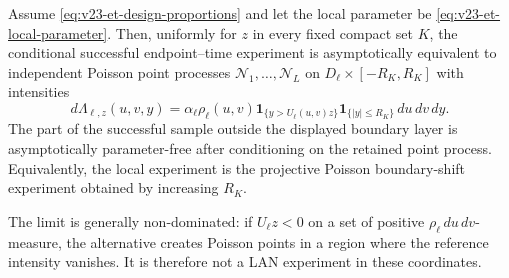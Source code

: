 \begin{theorem}
\label{thm:v23-et-poisson}
Assume \eqref{eq:v23-et-design-proportions} and let the local parameter be
\eqref{eq:v23-et-local-parameter}.  Then, uniformly for \(z\) in every fixed
compact set \(K\), the conditional successful endpoint--time experiment is
asymptotically equivalent to independent Poisson point processes
\(\mathcal N_1,\ldots,\mathcal N_L\) on
\(D_\ell\times[-R_K,R_K]\) with intensities
\begin{equation}\label{eq:v23-et-poisson-intensity}
 d\Lambda_{\ell,z}(u,v,y)
 =\alpha_\ell\rho_\ell(u,v)
   \mathbf 1_{\{y>U_\ell(u,v)z\}}
   \mathbf 1_{\{|y|\le R_K\}}\,du\,dv\,dy.
\end{equation}
The part of the successful sample outside the displayed boundary layer is
asymptotically parameter-free after conditioning on the retained point
process.  Equivalently, the local experiment is the projective Poisson
boundary-shift experiment obtained by increasing \(R_K\).

The limit is generally non-dominated: if
\(U_\ell z<0\) on a set of positive \(\rho_\ell\,du\,dv\)-measure, the
alternative creates Poisson points in a region where the reference intensity
vanishes.  It is therefore not a LAN experiment in these coordinates.
\end{theorem}

